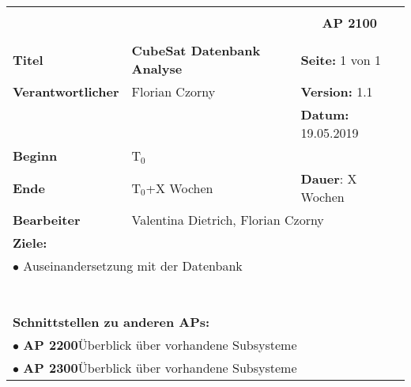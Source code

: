 \clearpage
\begin{table}[!h]
 \begin{center}
  \begin{tabular}{|p{35mm}||p{55mm}|p{50mm}||p{40mm}|}
   \hline
   \multicolumn{3}{|l||}{\textbf{}} & \multicolumn{1}{c|}{}\\
   \multicolumn{3}{|l||}{\textbf{}} & \multicolumn{1}{c|}{\textbf{AP 2100}}\\
   \multicolumn{3}{|l||}{\textbf{}} & \multicolumn{1}{c|}{}\\
   \hline\hline
   \textbf{Titel} & \multicolumn{2}{p{7cm}||}{\textbf{CubeSat Datenbank Analyse}} & \textbf{Seite:} 1 von 1\\
   \hline
   \textbf{Verantwortlicher} & \multicolumn{2}{l||}{Florian Czorny} & \textbf{Version:} 1.1\\
   \hline
   \multicolumn{3}{|l||}{} & \textbf{Datum:} 19.05.2019\\
   \hline\hline
   \textbf{Beginn} & \multicolumn{2}{l||}{T$_0$} & \\
   \hline
   \textbf{Ende} & \multicolumn{2}{l||}{T$_0$+X Wochen} & \textbf{Dauer}: X Wochen\\
   \hline\hline
   \textbf{Bearbeiter} & \multicolumn{3}{l|}{Valentina Dietrich, Florian Czorny}\\
   \hline\hline
   \multicolumn{4}{|p{150mm}|}{\textbf{Ziele:}}\\
   \multicolumn{4}{|p{150mm}|}{$\bullet$ Auseinandersetzung mit der Datenbank }\\
   \multicolumn{4}{|p{150mm}|}{}\\
   \multicolumn{4}{|p{150mm}|}{}\\
   \multicolumn{4}{|p{150mm}|}{}\\
   \multicolumn{4}{|p{150mm}|}{}\\
   \multicolumn{4}{|p{150mm}|}{}\\
   \multicolumn{4}{|p{150mm}|}{}\\
   \multicolumn{4}{|p{150mm}|}{}\\
   \multicolumn{4}{|p{150mm}|}{\textbf{Schnittstellen zu anderen APs:}}\\
   \multicolumn{4}{|p{150mm}|}{$\bullet$ \textbf{AP 2200}Überblick über vorhandene Subsysteme }\\
   \multicolumn{4}{|p{150mm}|}{$\bullet$ \textbf{AP 2300}Überblick über vorhandene Subsysteme }\\

\end{tabular}
\end{center}
\end{table}
